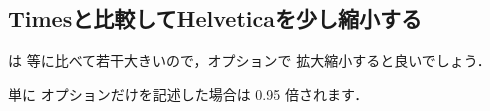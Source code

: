 \begin{inonly}
\usepackage{avant} %
\end{inonly}

\begin{inonly}
\usepackage{courier} 
\end{inonly}

\begin{inonly}
\usepackage{charter} 
\end{inonly}

\begin{inonly}
\usepackage{chancery} 
\end{inonly}








\subsection{Timesと比較してHelveticaを少し縮小する}
は  等に比べて若干大きいので，オプションで
拡大縮小すると良いでしょう．

\begin{intext}
\usepackage[scaled=.92]{helvet}
\end{intext}

単に  オプションだけを記述した場合は 0.95 倍されます．

